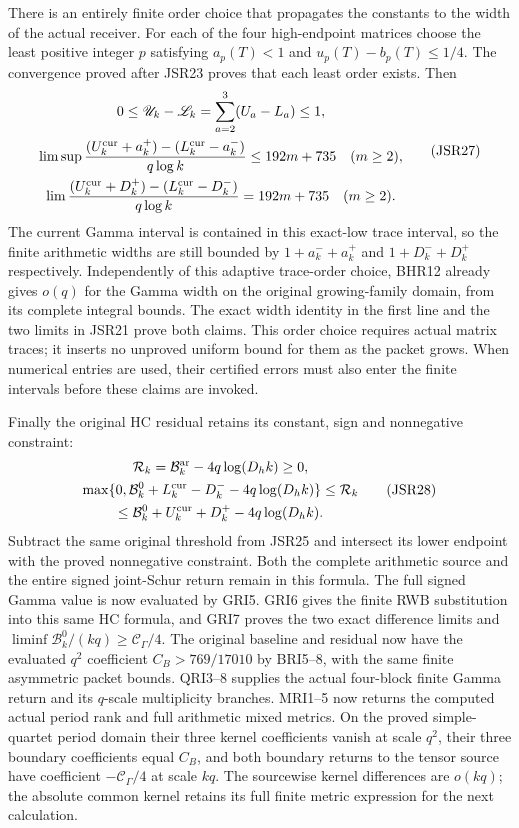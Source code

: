 \documentclass[11pt,a4paper]{article}
\begin{document}
There is an entirely finite order choice that propagates
the constants to the width of the actual receiver.
For each of the four high-endpoint matrices choose the least positive
integer $p$ satisfying $a_p(T)<1$ and
$u_p(T)-b_p(T)\leq1/4$. The convergence proved after
JSR23 proves that each least order exists. Then
\[
\begin{gathered}
 0\leq\mathscr U_k-\mathscr L_k
   =\sum_{a=2}^3(U_a-L_a)\leq1,\\
 \limsup\frac{
   (U_k^{\rm cur}+a_k^+)-(L_k^{\rm cur}-a_k^-)}{q\log k}
   \leq192m+735\quad(m\geq2),\\
 \lim\frac{
   (U_k^{\rm cur}+D_k^+)-(L_k^{\rm cur}-D_k^-)}{q\log k}
   =192m+735\quad(m\geq2).
\end{gathered}\tag{JSR27}
\]
The current Gamma interval is contained in this exact-low
trace interval, so the finite arithmetic widths are still
bounded by $1+a_k^-+a_k^+$ and $1+D_k^-+D_k^+$ respectively.
Independently of this adaptive trace-order choice, BHR12
already gives $o(q)$ for the Gamma width on the original
growing-family domain, from its complete integral bounds.
The exact width identity in the first line and the
two limits in JSR21 prove both claims. This order choice
requires actual matrix traces; it inserts no unproved
uniform bound for them as the packet grows. When numerical
entries are used, their certified errors must also enter
the finite intervals before these claims are invoked.

Finally the original HC residual retains its constant,
sign and nonnegative constraint:
\[
\begin{gathered}
 \mathcal R_k=\mathcal B_k^{\rm ar}-4q\log(D_hk)\geq0,\\
 \max\{0,\mathcal B_k^0+L_k^{\rm cur}-D_k^-
                         -4q\log(D_hk)\}
 \leq\mathcal R_k\\
 \leq\mathcal B_k^0+U_k^{\rm cur}+D_k^+
                         -4q\log(D_hk).
\end{gathered}\tag{JSR28}
\]
Subtract the same original threshold from JSR25 and
intersect its lower endpoint with the proved nonnegative
constraint. Both the complete arithmetic source and the
entire signed joint-Schur return remain in this formula.
The full signed Gamma value is now evaluated by GRI5.
GRI6 gives the finite RWB substitution into this same HC
formula, and GRI7 proves the two exact difference limits
and $\liminf\mathcal B_k^0/(kq)\geq\mathcal C_\Gamma/4$.
The original baseline and residual now have the evaluated
$q^2$ coefficient $C_B>769/17010$ by BRI5--8, with the same
finite asymmetric packet bounds. QRI3--8 supplies the actual
four-block finite Gamma return and its $q$-scale multiplicity
branches. MRI1--5 now returns the computed actual period rank
and full arithmetic mixed metrics. On the proved simple-quartet
period domain their three kernel coefficients vanish at scale
$q^2$, their three boundary coefficients equal $C_B$, and both
boundary returns to the tensor source have coefficient
$-\mathcal C_\Gamma/4$ at scale $kq$. The sourcewise kernel
differences are $o(kq)$; the absolute common kernel retains
its full finite metric expression for the next calculation.
\end{document}
